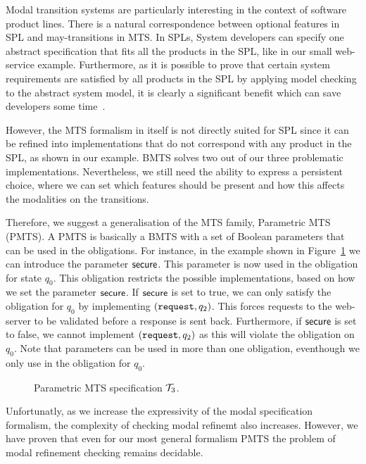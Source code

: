 Modal transition systems are particularly interesting in the context of software product lines. There is a natural correspondence between optional features in SPL and may-transitions in MTS. In SPLs, System developers can specify one abstract specification that fits all the products in the SPL, like in our small web-service example. Furthermore, as it is possible to prove that certain system requirements are satisfied by all products in the SPL by applying model checking to the abstract system model, it is clearly a significant benefit which can save developers some time~\cite{BCK2011, AHLNW:EATCS:08}.

However, the MTS formalism in itself is not directly suited for SPL since it can be refined into implementations that do not correspond with any product in the SPL, as shown in our example. BMTS solves two out of our three problematic implementations. Nevertheless, we still need the ability to express a persistent choice, where we can set which features should be present and how this affects the modalities on the transitions.

Therefore, we suggest a generalisation of the MTS family, Parametric MTS (PMTS). A PMTS is basically a BMTS with a set of Boolean parameters that can be used in the obligations. For instance, in the example shown in Figure~\ref{fig:pmts-file-service} we can introduce the parameter $\mathsf{secure}$. This parameter is now used in the obligation for state $q_0$. This obligation restricts the possible implementations, based on how we set the parameter $\mathsf{secure}$. If $\mathsf{secure}$ is set to true, we can only satisfy the obligation for $q_0$ by implementing $(\mathtt{request},q_2)$. This forces requests to the web-server to be validated before a response is sent back. Furthermore, if $\mathsf{secure}$ is set to false, we cannot implement $(\mathtt{request},q_2)$ as this will violate the obligation on $q_0$. Note that parameters can be used in more than one obligation, eventhough we only use  in the obligation for $q_0$.

\begin{figure}[ht]       
\centering
    
    \caption{Parametric MTS specification $\mathcal{T}_3$.}
    \label{fig:pmts-file-service}
\end{figure}

Unfortunatly, as we increase the expressivity of the modal specification formalism, the complexity of checking modal refinemt also increases. However, we have proven that even for our most general formalism PMTS the problem of modal refinement checking remains decidable.

